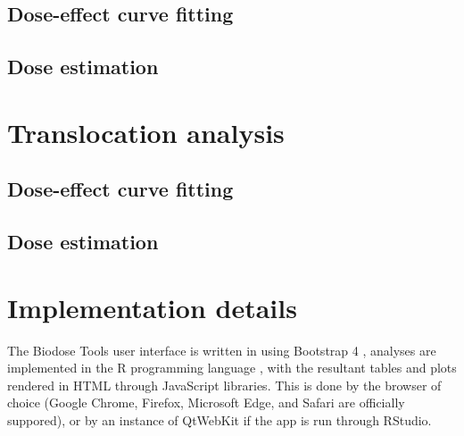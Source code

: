 \documentclass[]{scrartcl}
\begin{document}
\hypertarget{dose-effect-curve-fitting}{%
\subsection{Dose-effect curve fitting}\label{dose-effect-curve-fitting}}

\hypertarget{dose-estimation}{%
\subsection{Dose estimation}\label{dose-estimation}}

\hypertarget{stats-trans}{%
\section{Translocation analysis}\label{stats-trans}}

\hypertarget{dose-effect-curve-fitting-1}{%
\subsection{Dose-effect curve fitting}\label{dose-effect-curve-fitting-1}}

\hypertarget{dose-estimation-1}{%
\subsection{Dose estimation}\label{dose-estimation-1}}

\hypertarget{refs}{}

\hypertarget{appendix-appendices}{%
\appendix}


\hypertarget{app:implementation}{%
\section{Implementation details}\label{app:implementation}}

The Biodose Tools user interface is written in \citep{R-shiny} using Bootstrap 4 \citep{R-bs4Dash}, analyses are implemented in the R programming language \citep{R-base}, with the resultant tables and plots rendered in HTML through JavaScript libraries. This is done by the browser of choice (Google Chrome, Firefox, Microsoft Edge, and Safari are officially suppored), or by an instance of QtWebKit if the app is run through RStudio.


\end{document}
